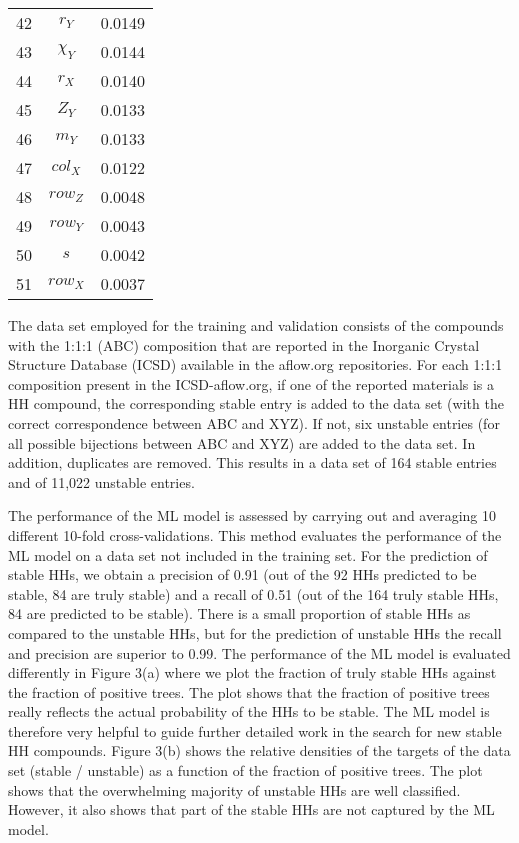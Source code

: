 \documentclass[pt10,journal=jacsat,manuscript=article,layout=twocolumn]{achemso}
\begin{document}
\begin{table*}
\begin{minipage}{0.28\textwidth}
\begin{tabular}{ccc}
42 & $r_Y$     &       0.0149\\
43 & $\chi_Y$     &       0.0144\\
44 & $r_X$     &       0.0140\\
45 & $Z_Y$     &       0.0133\\
46 & $m_Y$     &       0.0133\\
47 & $col_X$     &       0.0122\\
48 & $row_Z$     &       0.0048\\
49 & $row_Y$     &       0.0043\\
50 & $s$     &       0.0042\\
51 & $row_X$     &       0.0037\\
\bottomrule
\end{tabular}
\end{minipage}
\end{table*}

The data set employed for the training and validation consists of the compounds with the 1:1:1 (ABC) composition that are reported in the Inorganic Crystal Structure Database (ICSD) available in the aflow.org\cite{AFLOWAnautomaticframework,AFLOW104,Aforexchangingmaterialsdata} repositories. For each 1:1:1 composition present in the ICSD-aflow.org, if one of the reported materials is a HH compound, the corresponding stable entry is added to the data set (with the correct correspondence between ABC and XYZ). If not, six unstable entries (for all possible bijections between ABC and XYZ) are added to the data set. In addition, duplicates are removed. This results in a data set of 164 stable entries and of 11,022 unstable entries.



The performance of the ML model is assessed by carrying out and averaging 10 different 10-fold cross-validations. This method evaluates the performance of the ML model on a data set not included in the training set.  For the prediction of stable HHs, we obtain a precision of 0.91 (out of the 92 HHs predicted to be stable, 84 are truly stable) and a recall of 0.51 (out of the 164 truly stable HHs, 84 are predicted to be stable). There is a small proportion of stable HHs as compared to the unstable HHs, but for the prediction of unstable HHs the recall and precision are superior to 0.99. The performance of the ML model is evaluated differently in Figure 3(a) where we plot the fraction of truly stable HHs against the fraction of positive trees. The plot shows that the fraction of positive trees really reflects the actual probability of the HHs to be stable. The ML model is therefore very helpful to guide further detailed work in the search for new stable HH compounds. Figure 3(b) shows the relative densities of the targets of the data set (stable / unstable) as a function of the fraction of positive trees. The plot shows that the overwhelming majority of unstable HHs are well classified. However, it also shows that part of the stable HHs are not captured by the ML model. 
\end{document}
